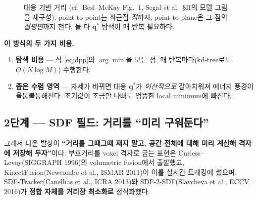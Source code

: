 \begin{figure}[htbp]
\centering
{}
\caption{대응 기반 거리 (cf.\ Besl--McKay Fig.~1, Segal et al.\ \S II의
모델 그림을 재구성). point-to-point는 최근접 \emph{점}까지, point-to-plane은
그 점의 \emph{접평면}까지 잰다. 둘 다 $\mathbf{q}^*$ 탐색이 매 반복 필요하다.}
\label{fig:icp-dist}
\end{figure}

\textbf{이 방식의 두 가지 비용.}
\begin{enumerate}
  \item \textbf{탐색 비용} --- 식 \eqref{eq:dpp}의 $\arg\min$을 모든 점,
  매 반복마다(kd-tree로도 $O(N\log M)$) 수행한다.
  \item \textbf{좁은 수렴 영역} --- 자세가 바뀌면 대응 $\mathbf{q}^*$가
  \emph{이산적으로} 갈아치워져 에너지 풍경이 울퉁불퉁해진다. 초기값이 조금만
  나빠도 엉뚱한 local minimum에 빠진다.
\end{enumerate}

\subsection{2단계 --- SDF 필드: 거리를 ``미리 구워둔다''}

그래서 나온 발상이 \textbf{``거리를 그때그때 재지 말고, 공간 전체에 대해
미리 계산해 격자에 저장해 두자''}이다. 부호거리를 voxel 격자로 굽는 표현은
Curless--Levoy(SIGGRAPH 1996)의 volumetric fusion에서 출발했고,
KinectFusion(Newcombe et al., ISMAR 2011)이 이를 실시간 트래킹에 썼으며,
SDF-Tracker(Canelhas et al., ICRA 2013)와 SDF-2-SDF(Slavcheva et al.,
ECCV 2016)가 \textbf{정합 자체를 거리장 최소화로} 정식화했다.

